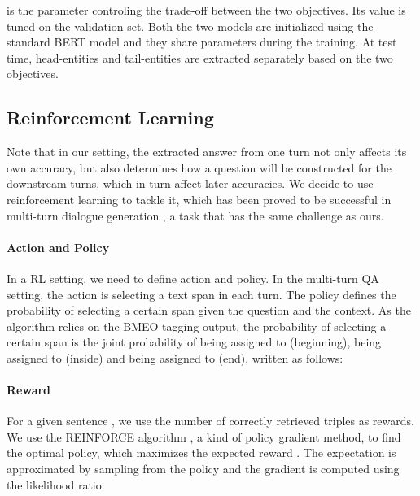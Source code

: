 \documentclass[11pt,a4paper]{article}
\begin{document}
 is the parameter controling the trade-off between the two objectives. Its value is tuned on the validation set. 
Both the two models are initialized using the standard BERT model and they share parameters during the training. 
At test time, head-entities and tail-entities are extracted separately based on the two objectives. 
\begin{comment}
We use pre-trained BERT models  with cased WordPiece for initialization. 
The text is tokenized using WordPiece tokenizer. During the training, model parameters are updated using Adam \cite{adam} with a mini-batch size of 16 and an initial learning rate . The dropout rate is set to 0.2.
Other parameters are tuned on the validation set. We train our proposed system on four NVIDIA TITAN Xp GPUs and the fine-tuning takes approximately 3-5 hours. 
\end{comment}
\subsection{Reinforcement Learning}
Note that in our setting, 
the extracted answer from one turn 
not only affects its own accuracy, but also determines how
a question will be constructed for the downstream turns, which in turn affect later accuracies. We decide to use reinforcement learning to tackle it, which has been proved to be successful in  multi-turn dialogue generation \cite{mrkvsic2015multi,li2016dialogue,wen2016network}, a task that has the same challenge as ours. 

 
\paragraph{Action and Policy} In a RL setting, we need to define action and policy.  
In the multi-turn QA setting, 
the action is selecting a text span in each turn.
The policy defines the probability of selecting a certain span given the question and the context. 
As the algorithm   relies on the BMEO tagging output, the probability of selecting a certain span  is the joint probability of  being assigned to  (beginning),  being assigned to  (inside) and  being assigned to  (end), written as follows:

\paragraph{Reward}
For a given sentence , we use the number of correctly retrieved triples as rewards. 
We use the REINFORCE algorithm \cite{williams1992simple}, a kind of policy gradient method, to find the optimal policy, which maximizes the expected reward . The expectation is approximated by sampling from the policy  and the gradient is computed using the likelihood ratio:
 
\end{document}
